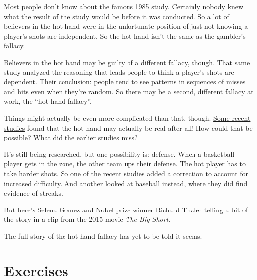 \documentclass[justified]{tufte-book}
\theoremstyle{definition}
\theoremstyle{definition}
\theoremstyle{definition}
\theoremstyle{remark}
\begin{document}
Most people don't know about the famous 1985 study. Certainly nobody knew what the result of the study would be before it was conducted. So a lot of believers in the hot hand were in the unfortunate position of just not knowing a player's shots are independent. So the hot hand isn't the same as the gambler's fallacy.

Believers in the hot hand may be guilty of a different fallacy, though. That same study analyzed the reasoning that leads people to think a player's shots are dependent. Their conclusion: people tend to see patterns in sequences of misses and hits even when they're random. So there may be a second, different fallacy at work, the ``hot hand fallacy''.

Things might actually be even more complicated than that, though. \href{https://www.gsb.stanford.edu/insights/jeffrey-zwiebel-why-hot-hand-may-be-real-after-all}{Some recent studies} found that the hot hand may actually be real after all! How could that be possible? What did the earlier studies miss?

It's still being researched, but one possibility is: defense. When a basketball player gets in the zone, the other team ups their defense. The hot player has to take harder shots. So one of the recent studies added a correction to account for increased difficulty. And another looked at baseball instead, where they did find evidence of streaks.

\begin{marginfigure}
But here's \href{https://www.youtube.com/watch?v=WStmFKp1x3g}{Selena
Gomez and Nobel prize winner Richard Thaler} telling a bit of the story
in a clip from the 2015 movie \emph{The Big Short}.
\end{marginfigure}

The full story of the hot hand fallacy has yet to be told it seems.

\hypertarget{exercises-3}{%
\section*{Exercises}\label{exercises-3}}
\end{document}
